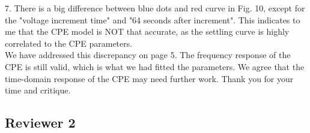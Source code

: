 \documentclass[journal, a4paper]{IEEEtran}
\begin{document}
{7. There is a big difference between blue dots and red curve in Fig. 10, except for the "voltage increment time" and "64 seconds after increment".  This indicates to me that the CPE model is NOT that accurate, as the settling curve is highly correlated to the CPE parameters.\\
{\color{OliveGreen}
    We have addressed this discrepancy on page 5. The frequency response of the CPE is still valid, which is what we had fitted the parameters. We agree that the time-domain response of the CPE may need further work. Thank you for your time and critique.
}\\
}

\subsection*{Reviewer 2}
\end{document}
